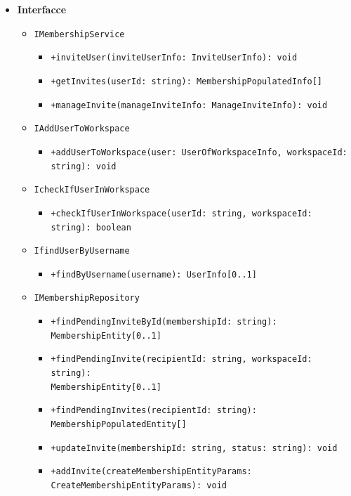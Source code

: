 \documentclass[a4paper, 11pt]{article}
\begin{document}
\begin{itemize}
	\item \textbf{Interfacce}
		\begin{itemize}
			\item \texttt{IMembershipService}
				\begin{itemize}
					\item \texttt{+inviteUser(inviteUserInfo: InviteUserInfo): void}
					\item \texttt{+getInvites(userId: string): MembershipPopulatedInfo[]}
					\item \texttt{+manageInvite(manageInviteInfo: ManageInviteInfo): void}
				\end{itemize}
			\item \texttt{IAddUserToWorkspace}
				\begin{itemize}
					\item \texttt{+addUserToWorkspace(user: UserOfWorkspaceInfo, workspaceId: string): void}
				\end{itemize}
			\item \texttt{IcheckIfUserInWorkspace}
				\begin{itemize}
					\item \texttt{+checkIfUserInWorkspace(userId: string, workspaceId: string): boolean}
				\end{itemize}
			\item \texttt{IfindUserByUsername}
				\begin{itemize}
					\item \texttt{+findByUsername(username): UserInfo[0..1]}
				\end{itemize}
			\item \texttt{IMembershipRepository}
				\begin{itemize}
					\item \texttt{+findPendingInviteById(membershipId: string): MembershipEntity[0..1]}
					\item \texttt{+findPendingInvite(recipientId: string, workspaceId: string):}\\
          \texttt{MembershipEntity[0..1]}
					\item \texttt{+findPendingInvites(recipientId: string): MembershipPopulatedEntity[]}
					\item \texttt{+updateInvite(membershipId: string, status: string): void}
					\item \texttt{+addInvite(createMembershipEntityParams: CreateMembershipEntityParams): void}
				\end{itemize}
		\end{itemize}

\end{itemize}
\end{document}

